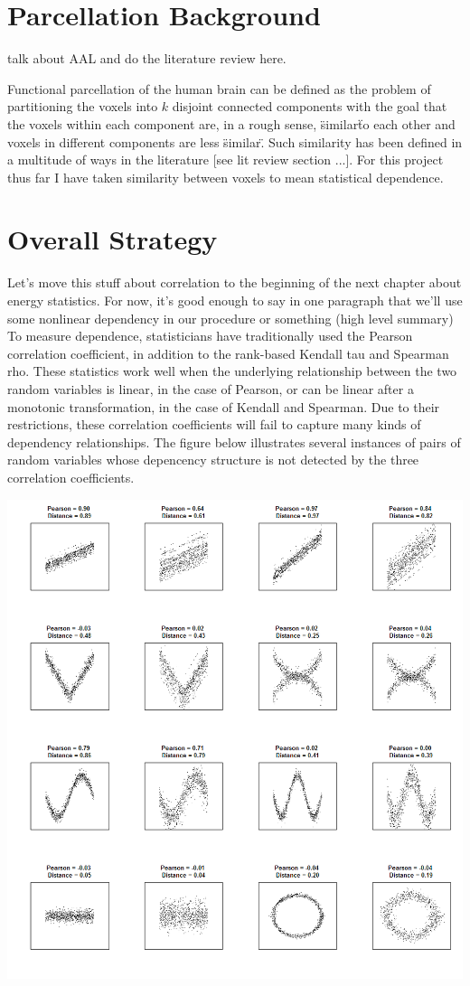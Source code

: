 \section{Parcellation Background}

{\color{red}talk about AAL and do the literature review here.}

Functional parcellation of the human brain can be defined as the problem
of partitioning the voxels into $k$ disjoint connected components with
the goal that the voxels within each component are, in a rough sense,
\"similar\" to each other and voxels in different components are less
\"similar\". Such similarity has been defined in a multitude of ways in
the literature [see lit review section ...]. For this project thus far I
have taken similarity between voxels to mean statistical dependence.

\section{Overall Strategy}
{\color{red}Let's move this stuff about correlation to the beginning of the next
chapter about energy statistics.
For now, it's good enough to say in one paragraph that we'll use some nonlinear
dependency 
in our procedure or something (high level summary)}
To measure dependence, statisticians have traditionally used the Pearson
correlation coefficient, in addition to the rank-based Kendall tau and
Spearman rho. These statistics work well when the underlying
relationship between the two random variables is linear, in the case of
Pearson, or can be linear after a monotonic transformation, in the case
of Kendall and Spearman. Due to their restrictions, these correlation
coefficients will fail to capture many kinds of dependency
relationships. The figure below illustrates several instances of pairs
of random variables whose depencency structure is not detected by the
three correlation coefficients.

\includegraphics[scale = 0.8]{figs/1_nonlinear_depend.png}

